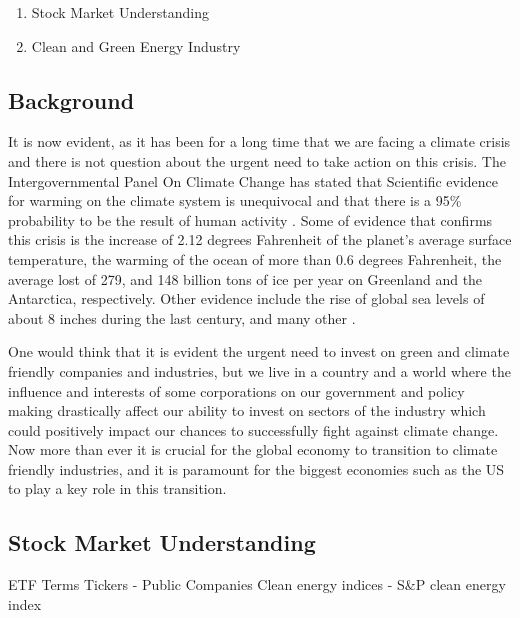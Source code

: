 \documentclass[sigconf, nonacm]{acmart}
\begin{document}
\begin{enumerate}
    \item Stock Market Understanding


     \item Clean and Green Energy Industry 
\end{enumerate}
\subsection{Background}
\begin{flushleft}
It is now evident, as it has been for a long time that we are facing a climate crisis and there is not question about the urgent need to take action on this crisis. The Intergovernmental Panel On Climate Change has stated that Scientific evidence for warming on the climate system is unequivocal and that there is a 95\% probability to be the result of human activity \cite{nasa_2021}.  Some of evidence that confirms this crisis is the increase of 2.12 degrees Fahrenheit  of the planet's average surface temperature, the warming of the ocean of more than 0.6 degrees Fahrenheit, the average lost of 279, and 148 billion tons of ice per year on Greenland and the Antarctica, respectively. Other evidence include the rise of global sea levels of about 8 inches during the last century, and many other  \cite{nasa_2021}.
\end{flushleft}

\begin{flushleft}
One would think that it is evident the urgent need to invest on green and climate friendly companies and industries, but we live in a country and a world where the influence and interests of some corporations on our government and policy making drastically affect our ability to invest on sectors of the industry which could positively impact our chances to successfully fight against climate change. Now more than ever it is crucial for the global economy to transition to climate friendly industries, and it is paramount for the biggest economies such as the US to play a key role in this transition. 
\end{flushleft}


\subsection{Stock Market Understanding}
    ETF Terms 
Tickers - Public Companies
Clean energy indices - S\&P clean energy index
\end{document}
